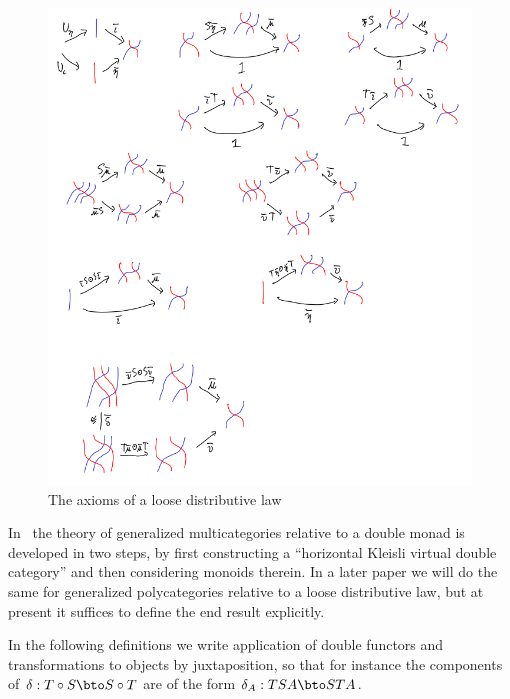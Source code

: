 \documentclass{amsart}
\let\oc\circ
\newcommand{\dl}{\delta}
\begin{document}
\begin{figure}[p]
  \centering
  \includegraphics[width=\textwidth]{hdl-axioms.png}
  \caption{The axioms of a loose distributive law}
  \label{fig:hdl-axioms}
\end{figure}

In~\cite{cs:genmulti} the theory of generalized multicategories relative to a double monad is developed in two steps, by first constructing a ``horizontal Kleisli virtual double category'' and then considering monoids therein.
In a later paper we will do the same for generalized polycategories relative to a loose distributive law, but at present it suffices to define the end result explicitly.

In the following definitions we write application of double functors and transformations to objects by juxtaposition, so that for instance the components of $\dl:T\oc S \bto S \oc T$ are of the form $\dl_A : T S A \bto S T A$.
\end{document}
